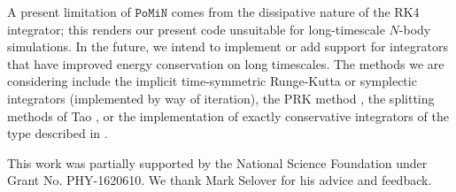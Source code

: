\documentclass[aps,onecolumn,notitlepage,eqsecnum,nofootinbib,floatfix,superscriptaddress]{revtex4-1}
\newcommand{\codename}{\mathtt{PoMiN}}
\begin{document}
A present limitation of $\codename$ comes from the dissipative nature of the RK4 integrator; this renders our present code unsuitable for long-timescale $N$-body simulations. In the future, we intend to implement or add support for integrators that have improved energy conservation on long timescales. The methods we are considering include the implicit time-symmetric Runge-Kutta or symplectic integrators \cite{Hutetal1997,Hutetal1995} (implemented by way of iteration), the PRK method \cite{SanzSernaCalvo1994}, the splitting methods of Tao \cite{Tao2016}, or the implementation of exactly conservative integrators of the type described in \cite{Shadwicketal1995}. 

\begin{acknowledgments}
This work was partially supported by the National Science Foundation under Grant No. PHY-1620610. We thank Mark Selover for his advice and feedback.
\end{acknowledgments}


\end{document}
